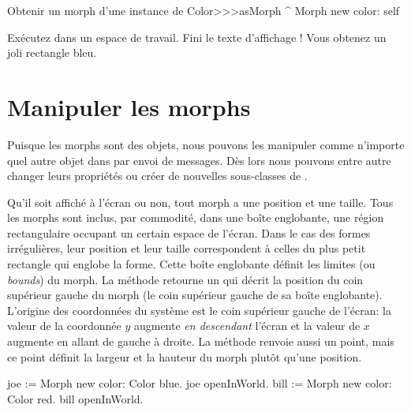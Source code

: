 \documentclass[a4paper,10pt,twoside]{book}
\begin{document}
\begin{method}{Obtenir un morph d'une instance de }
Color>>>asMorph
	^ Morph new color: self
\end{method}
\noindent
Exécutez   dans un
espace de travail. Fini le texte d'affichage ! Vous
obtenez un joli rectangle bleu.


\section{Manipuler les morphs}

Puisque les morphs sont des objets, nous pouvons les manipuler comme
n'importe quel autre objet dans \st \cad par envoi de messages. Dès
lors nous pouvons entre autre changer leurs propriétés ou créer
de nouvelles sous-classes de .

Qu'il soit affiché à l'écran ou non, tout morph a une position
et une taille. Tous les morphs sont inclus, par commodité, dans une
boîte englobante, \cad une région rectangulaire occupant un
certain espace de l'écran. Dans le cas des formes irrégulières,
leur position et leur taille correspondent à celles du plus petit
rectangle qui englobe la forme. Cette boîte englobante définit
les limites (ou \emph{bounds}) du morph. %
La méthode  retourne un  qui
décrit la position du coin supérieur gauche du morph (\cad le coin
supérieur gauche de sa boîte englobante).
L'origine des coordonnées du système est le coin supérieur
gauche de l'écran: la valeur de la coordonnée $y$ augmente
\emph{en descendant} l'écran et la valeur de $x$ augmente en allant
de gauche à droite.
La méthode  renvoie aussi un point, mais ce point
définit la largeur et la hauteur du morph plutôt qu'une position.

\begin{code}{}
joe := Morph new color: Color blue.
joe openInWorld.
bill := Morph new color: Color red.
bill openInWorld.
\end{code}
\noindent
\end{document}
